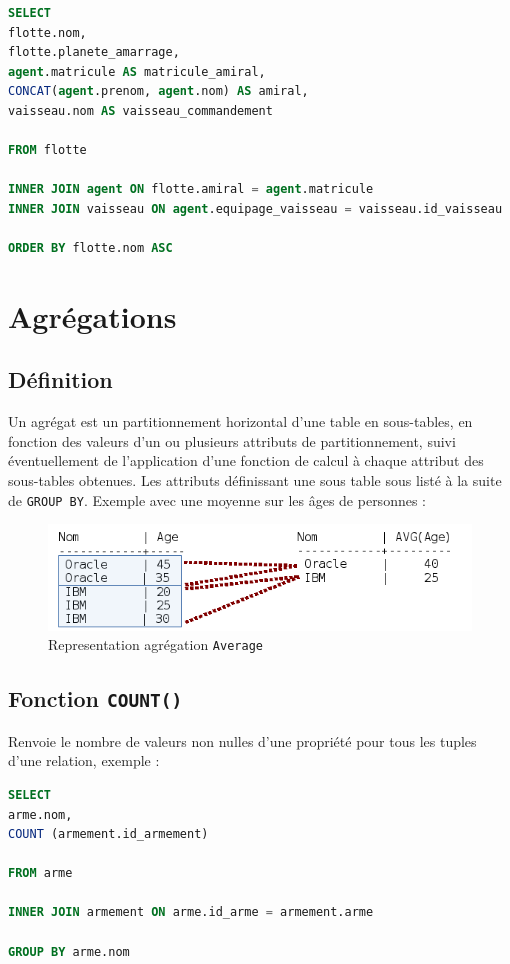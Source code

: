 \begin{lstlisting}[language=SQL]
SELECT
flotte.nom,
flotte.planete_amarrage,
agent.matricule AS matricule_amiral,
CONCAT(agent.prenom, agent.nom) AS amiral,
vaisseau.nom AS vaisseau_commandement

FROM flotte

INNER JOIN agent ON flotte.amiral = agent.matricule
INNER JOIN vaisseau ON agent.equipage_vaisseau = vaisseau.id_vaisseau

ORDER BY flotte.nom ASC
\end{lstlisting}

\section{Agrégations}\label{agregation}
\subsection{Définition}
Un agrégat est un partitionnement horizontal d'une table en sous-tables, en fonction des valeurs d'un ou plusieurs attributs de partitionnement, suivi éventuellement de l'application d'une fonction de calcul à chaque attribut des sous-tables obtenues. Les attributs définissant une sous table sous listé à la suite de \texttt{GROUP BY}. Exemple avec une moyenne sur les âges de personnes :

\begin{figure}[H]
    \centering
    \includegraphics[width=0.7\linewidth]{image/regroupement-avec-fonction-0.png}
    \caption{Representation agrégation \texttt{Average}}
    \label{fig:enter-label}
\end{figure}

\subsection{Fonction \texttt{COUNT()}}
Renvoie le nombre de valeurs non nulles d'une propriété pour tous les tuples d'une relation, exemple :
\begin{lstlisting}[language=SQL]
SELECT
arme.nom,
COUNT (armement.id_armement)

FROM arme

INNER JOIN armement ON arme.id_arme = armement.arme

GROUP BY arme.nom
\end{lstlisting}

